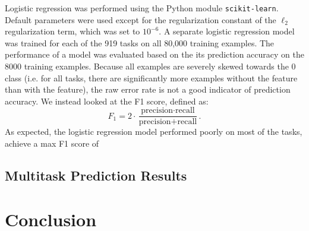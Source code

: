 \documentclass{article} %
\begin{document}
Logistic regression was performed using the Python module \texttt{scikit-learn}. Default parameters were used except for the regularization constant of the $\ell_2$ regularization term, which was set to $10^{-6}$. A separate logistic regression model was trained for each of the 919 tasks on all 80,000 training examples. The performance of a model was evaluated based on the its prediction accuracy on the 8000 training examples. Because all examples are severely skewed towards the 0 class (i.e. for all tasks, there are significantly more examples without the feature than with the feature), the raw error rate is not a good indicator of prediction accuracy. We instead looked at the F1 score, defined as:
$$ F_1 = 2 \cdot \frac{\mbox{precision} \cdot \mbox{recall} }{\mbox{precision} + \mbox{recall}}. $$
As expected, the logistic regression model performed poorly on most of the tasks, achieve a max F1 score of 

\subsection{Multitask Prediction Results}

\section{Conclusion}
 


\end{document}
